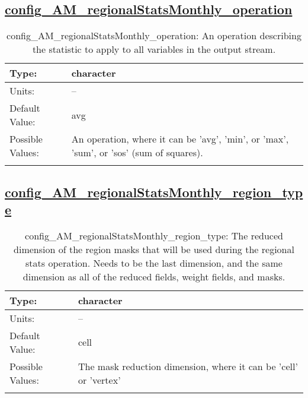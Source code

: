 \subsection[config\_AM\_regionalStatsMonthly\_operation]{\hyperref[sec:nm_tab_AM_regionalStatsMonthly]{config\_AM\_regionalStatsMonthly\_operation}}
\label{subsec:nm_sec_config_AM_regionalStatsMonthly_operation}
\begin{center}
\begin{longtable}{| p{2.0in} || p{4.0in} |}
    \hline
    Type: & character \\
    \hline
    Units: & -- \\
    \hline
    Default Value: & avg \\
    \hline
    Possible Values: & An operation, where it can be 'avg', 'min', or 'max', 'sum', or 'sos' (sum of squares). \\
    \hline
    \caption{config\_AM\_regionalStatsMonthly\_operation: An operation describing the statistic to apply to all variables in the output stream.}
\end{longtable}
\end{center}
\subsection[config\_AM\_regionalStatsMonthly\_region\_type]{\hyperref[sec:nm_tab_AM_regionalStatsMonthly]{config\_AM\_regionalStatsMonthly\_region\_type}}
\label{subsec:nm_sec_config_AM_regionalStatsMonthly_region_type}
\begin{center}
\begin{longtable}{| p{2.0in} || p{4.0in} |}
    \hline
    Type: & character \\
    \hline
    Units: & -- \\
    \hline
    Default Value: & cell \\
    \hline
    Possible Values: & The mask reduction dimension, where it can be 'cell' or 'vertex' \\
    \hline
    \caption{config\_AM\_regionalStatsMonthly\_region\_type: The reduced dimension of the region masks that will be used during the regional stats operation. Needs to be the last dimension, and the same dimension as all of the reduced fields, weight fields, and masks.}
\end{longtable}
\end{center}
